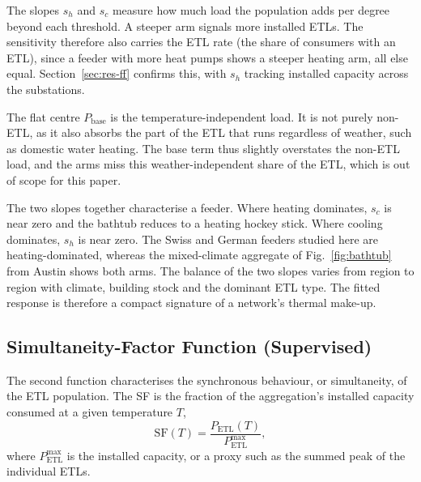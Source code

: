 \documentclass[9pt,journal,a4]{IEEEtran}
\begin{document}
The slopes $s_h$ and $s_c$ measure how much load the population adds per degree beyond each threshold. A steeper arm signals more installed ETLs. The sensitivity therefore also carries the ETL rate (the share of consumers with an ETL), since a feeder with more heat pumps shows a steeper heating arm, all else equal. Section~\ref{sec:res-ff} confirms this, with $s_h$ tracking installed capacity across the substations.

The flat centre $P_{\mathrm{base}}$ is the temperature-independent load. It is not purely non-ETL, as it also absorbs the part of the ETL that runs regardless of weather, such as domestic water heating. The base term thus slightly overstates the non-ETL load, and the arms miss this weather-independent share of the ETL, which is out of scope for this paper.

The two slopes together characterise a feeder. Where heating dominates, $s_c$ is near zero and the bathtub reduces to a heating hockey stick. Where cooling dominates, $s_h$ is near zero. The Swiss and German feeders studied here are heating-dominated, whereas the mixed-climate aggregate of Fig.~\ref{fig:bathtub} from Austin shows both arms. The balance of the two slopes varies from region to region with climate, building stock and the dominant ETL type. The fitted response is therefore a compact signature of a network's thermal make-up.


\subsection{Simultaneity-Factor Function (Supervised)}
\label{sec:fits-sf}

The second function characterises the synchronous behaviour, or simultaneity, of the ETL population. The SF is the fraction of the aggregation's installed capacity consumed at a given temperature $T$,
\begin{equation}
\mathrm{SF}(T) = \frac{P_{\mathrm{ETL}}(T)}{P_{\mathrm{ETL}}^{\max}},
\label{eq:sf}
\end{equation}
where $P_{\mathrm{ETL}}^{\max}$ is the installed capacity, or a proxy such as the summed peak of the individual ETLs. 
\end{document}
